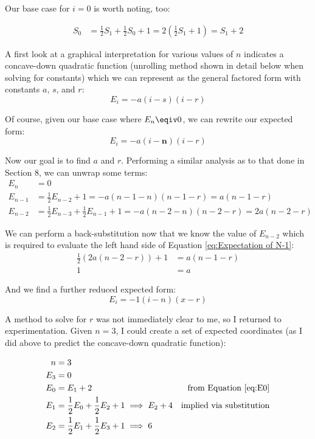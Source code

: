\documentclass[conference]{styles/acmsiggraph}
\newcommand{\?}{\stackrel{?}{=}}
\DeclareRobustCommand{\myalignbox}[2][gray!20]{%
\begin{tcolorbox}[   %
        breakable,
        left=0pt,
        right=0pt,
        top=0pt,
        bottom=12pt,
        colback=#1,
        colframe=#1,
        width=\dimexpr\textwidth\relax, 
        enlarge left by=0mm,
        boxsep=5pt,
        arc=0pt,outer arc=0pt,
        ]
        #2
\end{tcolorbox}
}
\begin{document}
Our base case for $i=0$ is worth noting, too:

\myalignbox{
\begin{align}
    S_0 &= \frac{1}{2}S_{1} + \frac{1}{2}S_{0} + 1 = 2 \left(\frac{1}{2}S_1 + 1 \right) = S_1 + 2 \label{eq:E0}
\end{align}}

A first look at a graphical interpretation for various values of $n$ indicates a concave-down quadratic function (unrolling method shown in detail below when solving for constants) which we can represent as the general factored form with constants $a$, $s$, and $r$:
$$ E_i = -a(i-s)(i-r) $$

Of course, given our base case where $E_n \eqiv 0$, we can rewrite our expected form: 
$$ E_i = -a(i-\mathbf{n})(i-r) $$

Now our goal is to find $a$ and $r$.  Performing a similar analysis as to that done in Section 8, we can unwrap some terms:
\begin{align}
    E_n &= 0\\
    E_{n-1} &= \frac{1}{2} E_{n-2} + 1 = -a(n-1-n)(n-1-r) = a(n-1-r) \label{eq:Expectation of N-1}\\
    E_{n-2} &= \frac{1}{2} E_{n-3} + \frac{1}{2} E_{n-1} + 1 = -a(n-2-n)(n-2-r) = 2a(n-2-r)
\end{align}

We can perform a back-substitution now that we know the value of $E_{n-2}$ which is required to evaluate the left hand side of Equation \ref{eq:Expectation of N-1}:
\begin{align*}
    \frac{1}{2} \left(2a(n-2-r)\right) + 1 &= a(n-1-r)\\
    1 &= a
\end{align*}

And we find a further reduced expected form:
\begin{equation}
    E_i = -1(i-n)(x-r) \label{EQ:genForm1}
\end{equation}


A method to solve for $r$ was not immediately clear to me, so I returned to experimentation.  Given $n=3$, I could create a set of expected coordinates (as I did above to predict the concave-down quadratic function):

\begin{align}
    n &= 3\\
    E_3 &= 0\\
    E_0 &= E_1 + 2 & \text{from Equation \ref{eq:E0}}\\
    E_1 &= \frac{1}{2}E_0 + \frac{1}{2}E_2 + 1 \implies E_2 +4 & \text{implied via substitution}\\
    E_2 &= \frac{1}{2}E_1 + \frac{1}{2}E_3 + 1 \implies 6
\end{align}
\end{document}
